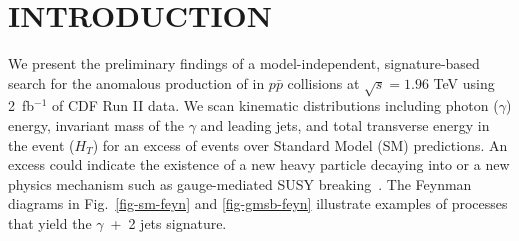 \documentclass[slac_one]{revtex4}
\begin{document}
\section{INTRODUCTION}
We present the preliminary findings of a model-independent, signature-based search for the anomalous production of \phojets in $p\bar{p}$ collisions at
$\sqrt{s} = 1.96$ TeV using 2~fb$^{-1}$  of CDF Run II data. We scan kinematic distributions including photon ($\gamma$) energy, invariant mass of the
$\gamma$ and leading jets, and total transverse energy in the event ($H_{T}$) for an excess of events over Standard Model (SM) predictions.  An excess
could indicate the existence of a new heavy particle decaying into \phojets or a new physics mechanism such as gauge-mediated SUSY
breaking~\cite{ref-models}. The Feynman diagrams in Fig.~\ref{fig-sm-feyn} and \ref{fig-gmsb-feyn} illustrate examples of processes that yield
the $\gamma$~+~2 jets signature.
\end{document}
